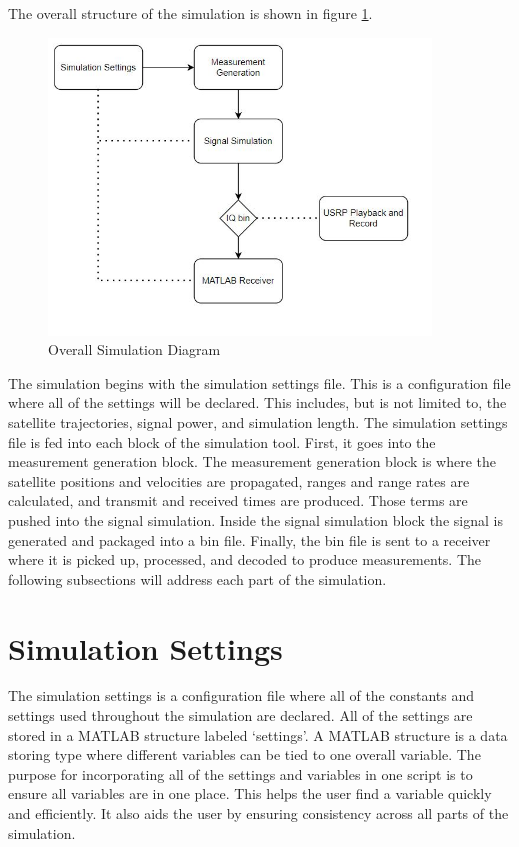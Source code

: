 \documentclass[12pt]{report}
\begin{document}
The overall structure of the simulation is shown in figure \ref{fig:SimDiagram}.
\begin{figure}[ht]
    \centering
    \includegraphics[width=4.0in]{OverallSimulationDiagram}
    \caption{Overall Simulation Diagram}
    \label{fig:SimDiagram}
\end{figure}

The simulation begins with the simulation settings file. This is a configuration file where all of the settings will be declared. This includes, but is not limited to, the satellite trajectories, signal power, and simulation length. The simulation settings file is fed into each block of the simulation tool. First, it goes into the measurement generation block. The measurement generation block is where the satellite positions and velocities are propagated, ranges and range rates are calculated, and transmit and received times are produced. Those terms are pushed into the signal simulation. Inside the signal simulation block the signal is generated and packaged into a bin file. Finally, the bin file is sent to a receiver where it is picked up, processed, and decoded to produce measurements. The following subsections will address each part of the simulation.

\section{Simulation Settings}

The simulation settings is a configuration file where all of the constants and settings used throughout the simulation are declared. All of the settings are stored in a MATLAB structure labeled `settings'. A MATLAB structure is a data storing type where different variables can be tied to one overall variable. The purpose for incorporating all of the settings and variables in one script is to ensure all variables are in one place. This helps the user find a variable quickly and efficiently. It also aids the user by ensuring consistency across all parts of the simulation. 
\end{document}
